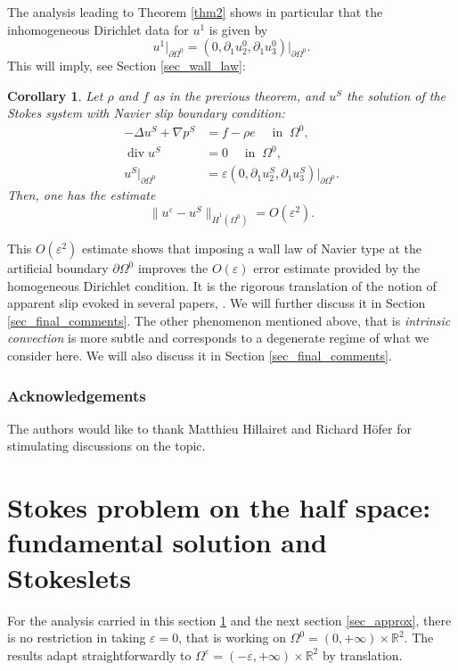 \documentclass[10pt]{amsart}
\let\epsilon\varepsilon
\renewcommand{\div}{\operatorname{div}}
\theoremstyle{plain}
\newtheorem{coro}[thm]{Corollary}
\theoremstyle{definition}
\let\pa\partial
\let\na\nabla
\let\eps\varepsilon
\newcommand{\R}{\mathbb{R}}
\begin{document}
The analysis leading to Theorem \ref{thm2} shows in particular that the inhomogeneous Dirichlet data for $u^1$ is given by
\begin{equation} \label{corrector_equation}
u^1 \vert_{\pa \Omega^0} = (0, \pa_1 u^0_{2},\pa_1 u^0_{3})\vert_{\pa \Omega^0}.
\end{equation}
This will imply, see Section \ref{sec_wall_law}:
\begin{coro} \label{coro1}
Let $\rho$ and $f$ as in the previous theorem, and $u^S$ the solution of the Stokes system with Navier slip boundary condition:
\begin{equation} \label{improved_approximation}
\begin{aligned}
-\Delta u^S + \na p^S & = f - \rho e \quad \text{ in } \: \Omega^0, \\
\div u^S & = 0 \quad \text{ in } \: \Omega^0, \\
u^S\vert_{\pa \Omega^0} & = \eps (0, \pa_1 u^S_2, \pa_1 u^S_3)\vert_{\pa \Omega^0}.
\end{aligned}
\end{equation}
Then, one has the estimate
\[
\|u^\eps-u^S\|_{\dot{H}^1(\Omega^0)} = O(\eps^2).
\]
\end{coro}
This $O(\eps^2)$ estimate shows that imposing a wall law of Navier type at the artificial boundary
$\pa \Omega^0$ improves the $O(\eps)$ error estimate provided by the homogeneous Dirichlet condition. It is the rigorous translation of the notion of apparent slip evoked in several papers, \cite{Abbasi,Koponen, Ghosh}. We will further discuss it in Section \ref{sec_final_comments}. The other phenomenon mentioned above, that is {\em intrinsic convection} is more subtle and corresponds to a degenerate regime of what we consider here. We will also discuss it in Section \ref{sec_final_comments}.

\subsubsection*{Acknowledgements}
The authors would like to thank Matthieu Hillairet and Richard Höfer for stimulating discussions on the topic.

\section{Stokes problem on the half space: fundamental solution and Stokeslets} \label{sec_stokes}
For the analysis carried in this section \ref{sec_stokes} and the next section \ref{sec_approx}, there is no restriction in taking $\eps = 0$, that is working on $\Omega^0 =(0,+\infty)\times \R^2$. The results adapt straightforwardly to $\Omega^\epsilon=(-\varepsilon,+\infty)\times \R^2$ by translation.
\end{document}
